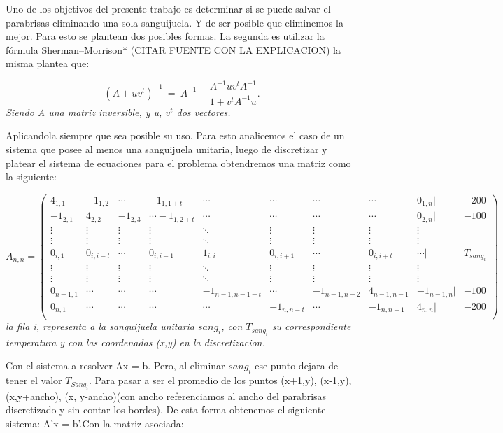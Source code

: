 \begin{itemize}
Uno de los objetivos del presente trabajo es determinar si se puede salvar el parabrisas eliminando una sola sanguijuela. Y de ser posible que eliminemos la mejor. Para esto se plantean dos posibles formas. La segunda es utilizar la fórmula Sherman–Morrison* (CITAR FUENTE CON LA EXPLICACION) la misma plantea que:

\begin{equation}
	(A+ uv^t)^{-1} \ =\ A^{-1} - \frac{ A^{-1} u v^t A^{-1} }{1+v^t A^{-1}u}.\label{eq:sm}
\end{equation} 
\textit{Siendo A una matriz inversible, y u, $v^t$ dos vectores.}


Aplicandola siempre que sea posible su uso. Para esto analicemos el caso de un sistema que posee al menos una sanguijuela unitaria, luego de discretizar y platear el sistema de ecuaciones para el problema obtendremos una matriz como la siguiente:

$$
A_{n,n} =
 \begin{pmatrix}
  4_{1,1} & -1_{1,2} & \cdots & -1_{1,1+t} & \cdots & \cdots & \cdots & \cdots  & 0_{1,n} | & -200 \\
   -1_{2,1} & 4_{2,2} & -1_{2,3} & \cdots -1_{1,2+t} & \cdots & \cdots & \cdots & \cdots & 0_{2,n} | & -100 \\
  \vdots  & \vdots  & \vdots & \vdots  & \ddots & \vdots  & \vdots & \vdots & \vdots\\
  \vdots  & \vdots & \vdots & \vdots  & \ddots & \vdots  & \vdots & \vdots & \vdots\\
   0_{i,1} & 0_{i,i-t} & \cdots & 0_{i,i-1} & 1_{i,i} &  0_{i,i+1} & \cdots & 0_{i,i+t} & \cdots | & T_{sang_i} \\
  \vdots  & \vdots  & \vdots & \vdots  & \ddots  & \vdots  & \vdots & \vdots & \vdots\\
  \vdots  & \vdots  & \vdots & \vdots  & \ddots  & \vdots  & \vdots & \vdots & \vdots\\
   0_{n-1,1} & \cdots & \cdots & \cdots & -1_{n-1,n-1-t} & \cdots & -1_{n-1,n-2} & 4_{n-1,n-1} &  -1_{n-1,n} | & -100 \\
   0_{n,1} & \cdots & \cdots & \cdots & \cdots & -1_{n,n-t} & \cdots & -1_{n,n-1} &  4_{n,n} | & -200 \\
 \end{pmatrix}
$$
\textit{la fila i, representa a la sanguijuela unitaria $sang_i$, con $T_{sang_i}$ su correspondiente temperatura y con las coordenadas (x,y) en la discretizacion.}\newline

Con el sistema a resolver Ax = b.\newline
Pero, al eliminar $sang_i$ ese punto dejara de tener el valor $T_{Sang_i}$. Para pasar a ser el promedio de los puntos (x+1,y), (x-1,y), (x,y+ancho), (x, y-ancho)(con ancho referenciamos al ancho del parabrisas discretizado y sin contar los bordes). De esta forma obtenemos el siguiente sistema: A'x = b'.\newline Con la matriz asociada:


\end{itemize}
